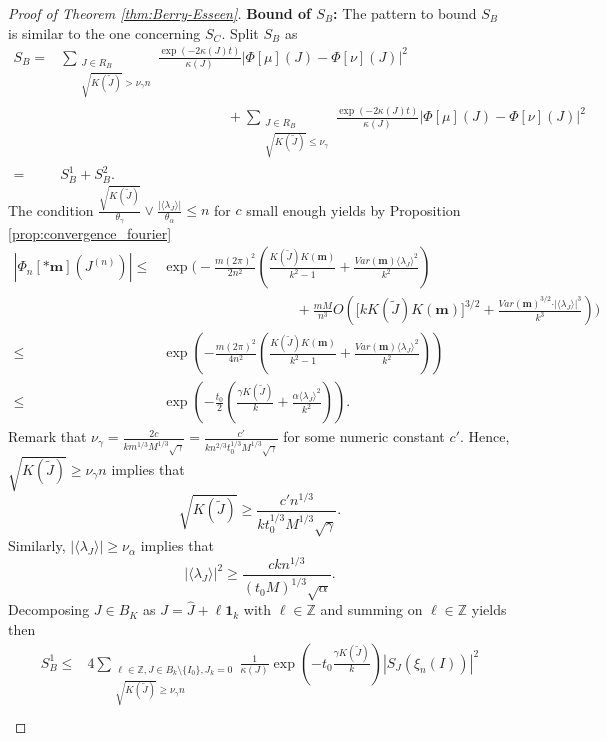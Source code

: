 \documentclass[10pt,11pt]{amsart}%
\begin{document}
\begin{proof}[Proof of Theorem \ref{thm:Berry-Esseen}]
\textbf{Bound of $S_B$:}
The pattern to bound $S_B$ is similar to the one concerning $S_C$. Split $S_B$ as 
\begin{align*}
S_B=&\sum_{\substack{J\in R_B\\\sqrt{K(\tilde{J})}>\nu_{\gamma} n}}\frac{\exp(-2\kappa(J)t)}{\kappa(J)}\left\vert \Phi[\mu](J)-\Phi[\nu](J)\right\vert^2\\
&\hspace{5cm}+\sum_{\substack{J\in R_B\\\sqrt{K(\tilde{J})}\leq \nu_{\gamma}}}\frac{\exp(-2\kappa(J)t)}{\kappa(J)}\left\vert \Phi[\mu](J)-\Phi[\nu](J)\right\vert^2\\
=&S_B^1+S_B^2.
\end{align*}
The condition $\frac{\sqrt{K(\tilde{J})}}{\theta_{\gamma}}\vee\frac{\vert\langle \lambda_J\rangle\vert}{ \theta_{\alpha}}\leq n$ for $c$ small enough yields by Proposition \ref{prop:convergence_fourier}
\begin{align*}
\left\vert\Phi_{n}[*\mathbf{m}](J^{(n)})\right\vert \leq& \exp\Bigg(-\frac{m(2\pi)^2}{2n^2}\left(\frac{K(\tilde{J})K(\mathbf{m})}{k^2-1}+\frac{Var(\mathbf{m})\langle \lambda_J\rangle^2}{k^2}\right)\\
&\hspace{4cm}+\frac{mM}{n^3}O\left(\Big[kK(\tilde{J})K(\mathbf{m})\Big]^{3/2}+\frac{Var(\mathbf{m})^{3/2}\cdot\vert\langle \lambda_J\rangle\vert^3}{k^3}\right)\Bigg)\\
\leq &\exp\left(-\frac{m(2\pi)^2}{4n^2}\left(\frac{K(\tilde{J})K(\mathbf{m})}{k^2-1}+\frac{Var(\mathbf{m})\langle \lambda_J\rangle^2}{k^2}\right)\right)\\
\leq&\exp\left(-\frac{t_0}{2}\left(\frac{\gamma K(\tilde{J})}{k}+\frac{\alpha\langle \lambda_J\rangle^2}{k^2}\right)\right).
\end{align*}
Remark that $\nu_{\gamma}=\frac{2c}{km^{1/3}M^{1/3}\sqrt{\gamma}}=\frac{c'}{kn^{2/3}t_0^{1/3}M^{1/3}\sqrt{\gamma}}$ for some numeric constant $c'$. Hence, $\sqrt{K(\tilde{J})}\geq \nu_{\gamma}n$ implies that 
$$\sqrt{K(\tilde{J})}\geq \frac{c'n^{1/3}}{kt_0^{1/3}M^{1/3}\sqrt{\gamma}}.$$
Similarly, $\vert\langle \lambda_J\rangle\vert\geq \nu_{\alpha}$ implies that 
$$\vert\langle \lambda_{J}\rangle\vert^2 \geq \frac{ckn^{1/3}}{(t_0M)^{1/3}\sqrt{\alpha}}.$$
Decomposing $J\in B_{K}$ as $J=\hat{J}+\ell \mathbf{1}_k$ with $\ell\in\mathbb{Z}$ and summing on $\ell\in \mathbb{Z}$ yields then
\begin{align*}
S_B^1\leq & 4\sum_{\substack{\ell\in\mathbb{Z},J\in B_{k}\setminus\{I_0\}, J_{k}=0\\\sqrt{K(\tilde{J})}\geq \nu_{\gamma} n}}\frac{1}{\kappa(J)}\exp\left(-t_0\frac{\gamma K(\tilde{J})}{k}\right)\left\vert S_{J}(\xi_n(I))\right\vert^2\\

\end{align*}
\end{proof}
\end{document}
